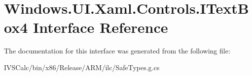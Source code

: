 \hypertarget{interface_windows_1_1_u_i_1_1_xaml_1_1_controls_1_1_i_text_box4}{}\section{Windows.\+U\+I.\+Xaml.\+Controls.\+I\+Text\+Box4 Interface Reference}
\label{interface_windows_1_1_u_i_1_1_xaml_1_1_controls_1_1_i_text_box4}


The documentation for this interface was generated from the following file\+:\begin{DoxyCompactItemize}
\item 
I\+V\+S\+Calc/bin/x86/\+Release/\+A\+R\+M/ilc/Safe\+Types.\+g.\+cs\end{DoxyCompactItemize}
